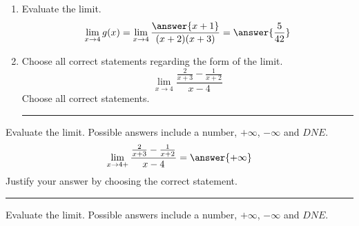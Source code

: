 \documentclass{ximera}
\begin{document}
\begin{exercise}
\begin{exercise}
\begin{enumerate}
\item Evaluate the limit.
\[
\lim_{x\to4}g(x) = \lim_{x\to4}\dfrac{\answer{x+1}}{(x+2)(x+3)}=\answer{\frac{5}{42}}
\]

\item Choose all correct statements regarding  the form of the limit. 
\[
\lim_{x\to4}\dfrac{ \frac{2}{x+3}-\frac{1}{x+2}}{x-4}
\]
Choose all correct statements.
\begin{selectAll} 
\end{selectAll}
\noindent\rule[0.5ex]{\linewidth}{0.2pt}
\end{enumerate}
\begin{exercise}
 Evaluate the limit. Possible answers include a number, $+\infty$, $-\infty$ and $DNE$.
\[
\lim_{x\to4+}\dfrac{ \frac{2}{x+3}-\frac{1}{x+2}}{x-4}=\answer{+\infty}
\]
 Justify your answer  by choosing the correct statement.
 \begin{selectAll} 
\end{selectAll}
\noindent\rule[0.5ex]{\linewidth}{0.2pt}
\begin{exercise}
 Evaluate the limit. Possible answers include a number, $+\infty$, $-\infty$ and $DNE$.


\end{exercise}
\end{exercise}
\end{exercise}
\end{exercise}
\end{document}
